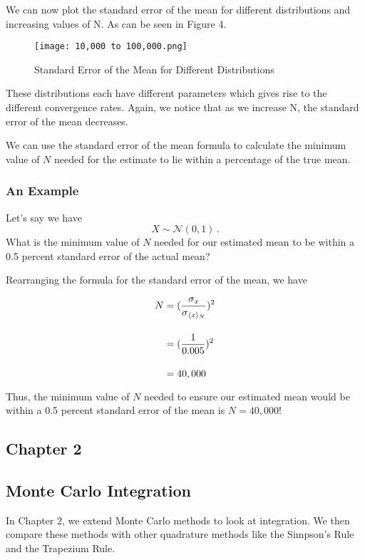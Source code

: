 \documentclass[12pt]{article}
\begin{document}
We can now plot the standard error of the mean for different distributions and increasing values of N. As can be seen in Figure 4. 
 
\begin{figure}[h!]
  \texttt{[image: 10,000 to 100,000.png]}
  \caption{Standard Error of the Mean for Different Distributions}
  \label{fig:estimated_mean}
\end{figure}

These distributions each have different parameters which gives rise to the different convergence rates. Again, we notice that as we increase N, the standard error of the mean decreases. 

We can use the standard error of the mean formula to calculate the minimum value of $N$ needed for the estimate to lie within a percentage of the true mean.

\subsubsection*{An Example}
Let's say we have \[
  X \sim \mathcal{N}(0,1)\,.
\]
What is the minimum value of $N$ needed for our estimated mean to be within a 0.5 percent standard error of the actual mean?

Rearranging the formula for the standard error of the mean, we have 
 

\begin{align}
N  &= (\frac{\sigma\textsubscript{$x$}}{\sigma\textsubscript{$\langle x\rangle$\textsubscript{$N$}}})^2\\\\
&= (\frac{1}{0.005})^2 \\\\
&= 40,000
\end{align}

Thus, the minimum value of $N$ needed to ensure our estimated mean would be within a 0.5 percent standard error of the mean is $N = 40,000$!

\subsection*{Chapter 2}
\subsection*{Monte Carlo Integration}

In Chapter 2, we extend Monte Carlo methods to look at integration. We then compare these methods with other quadrature methods like the Simpson's Rule and the Trapezium Rule. 
\end{document}
